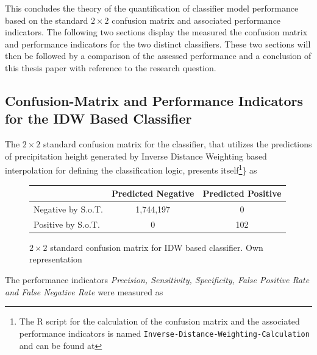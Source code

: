 \documentclass[
  12pt,
]{article}
\begin{document}
This concludes the theory of the quantification of classifier model
performance based on the standard \(2\times2\) confusion matrix and
associated performance indicators. The following two sections display
the measured the confusion matrix and performance indicators for the two
distinct classifiers. These two sections will then be followed by a
comparison of the assessed performance and a conclusion of this thesis
paper with reference to the research question.

\pagebreak

\hypertarget{confusion-matrix-and-performance-indicators-for-the-idw-based-classifier}{%
\subsection{Confusion-Matrix and Performance Indicators for the IDW
Based
Classifier}\label{confusion-matrix-and-performance-indicators-for-the-idw-based-classifier}}

The \(2\times2\) standard confusion matrix for the classifier, that
utilizes the predictions of precipitation height generated by Inverse
Distance Weighting based interpolation for defining the classification
logic, presents
itself\footnote{The R script for the calculation of the confusion matrix and the associated performance indicators is named \texttt{Inverse-Distance-Weighting-Calculation} and can be found at }\}
as

\vspace{0.75cm}

\begin{figure}[h]
\begin{table}[H]
\centering
\fontsize{12}{14}\selectfont
\begin{tabular}[t]{l|c|c}
\hline
  & Predicted Negative & Predicted Positive\\
\hline
Negative by S.o.T. & 1,744,197 & 0\\
\hline
Positive by S.o.T. & 0 & 102\\
\hline
\end{tabular}
\end{table}
\caption{\label{confusion_matrix_idw}$2\times2$ standard confusion matrix for IDW based classifier. Own representation}
\end{figure}

The performance indicators
\textit{Precision, Sensitivity, Specificity, False Positive Rate and False Negative Rate}
were measured as
\end{document}
